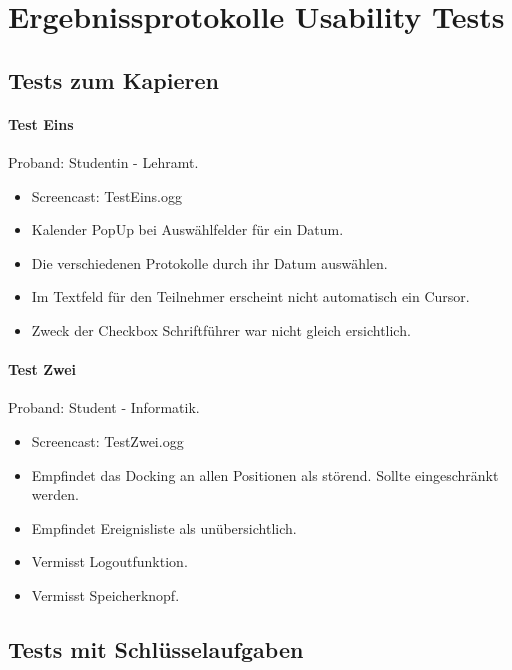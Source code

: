 \section{Ergebnissprotokolle Usability Tests}
\subsection{Tests zum Kapieren}
\paragraph*{Test Eins}
Proband: Studentin - Lehramt.
\begin{itemize}
	\item Screencast: Test\textunderscore Eins.ogg 
	\item Kalender PopUp bei Auswählfelder für ein Datum.
	\item Die verschiedenen Protokolle durch ihr Datum auswählen.
	\item Im Textfeld für den Teilnehmer erscheint nicht automatisch ein Cursor.
	\item Zweck der Checkbox Schriftführer war nicht gleich ersichtlich.

\end{itemize}

\paragraph*{Test Zwei}
Proband: Student - Informatik. 
\begin{itemize}
	\item Screencast: Test\textunderscore Zwei.ogg 
	\item Empfindet das Docking an allen Positionen als störend. Sollte eingeschränkt werden.
	\item Empfindet Ereignisliste als unübersichtlich.
	\item Vermisst Logoutfunktion.
	\item Vermisst Speicherknopf.
\end{itemize}

\subsection{Tests mit Schlüsselaufgaben}
